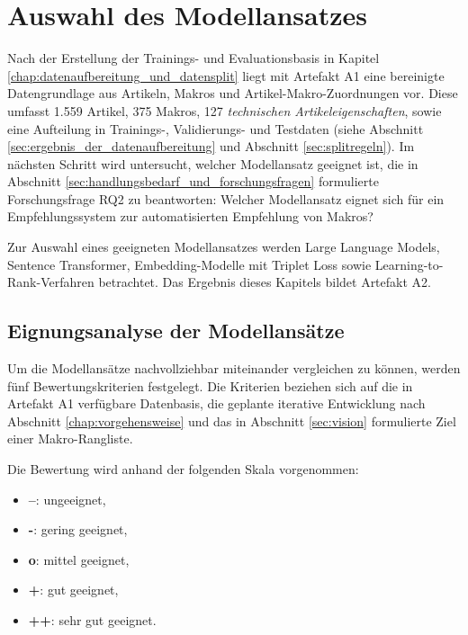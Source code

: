 ﻿\chapter{Auswahl des Modellansatzes} 
\label{chap:auswahl_des_modellansatzes}

Nach der Erstellung der Trainings- und Evaluationsbasis in Kapitel \ref{chap:datenaufbereitung_und_datensplit} liegt mit Artefakt A1 eine bereinigte Datengrundlage aus Artikeln, Makros und Artikel-Makro-Zuordnungen vor. 
Diese umfasst 1.559 Artikel, 375 Makros, 127 \textit{technischen Artikeleigenschaften}, sowie eine Aufteilung in Trainings-, Validierungs- und Testdaten (siehe Abschnitt \ref{sec:ergebnis_der_datenaufbereitung} und Abschnitt \ref{sec:splitregeln}). 
Im nächsten Schritt wird untersucht, welcher Modellansatz geeignet ist, die in Abschnitt \ref{sec:handlungsbedarf_und_forschungsfragen} formulierte Forschungsfrage RQ2 zu beantworten:
Welcher Modellansatz eignet sich für ein Empfehlungssystem zur automatisierten Empfehlung von Makros? 

Zur Auswahl eines geeigneten Modellansatzes werden Large Language Models, Sentence Transformer, Embedding-Modelle mit Triplet Loss sowie Learning-to-Rank-Verfahren betrachtet. 
Das Ergebnis dieses Kapitels bildet Artefakt A2.

\section{Eignungsanalyse der Modellansätze} 
\label{sec:eignungsanalyse_modellansaetze} 

Um die Modellansätze nachvollziehbar miteinander vergleichen zu können, werden fünf Bewertungskriterien festgelegt. 
Die Kriterien beziehen sich auf die in Artefakt A1 verfügbare Datenbasis,  die geplante iterative Entwicklung nach Abschnitt \ref{chap:vorgehensweise} und das in Abschnitt \ref{sec:vision} formulierte Ziel einer Makro-Rangliste.  

Die Bewertung wird anhand der folgenden Skala vorgenommen: 

\begin{itemize} 
    \item \textbf{--}: ungeeignet, 
    \item \textbf{-}: gering geeignet, 
    \item \textbf{o}: mittel geeignet, 
    \item \textbf{+}: gut geeignet, 
    \item \textbf{++}: sehr gut geeignet. 
\end{itemize} 

